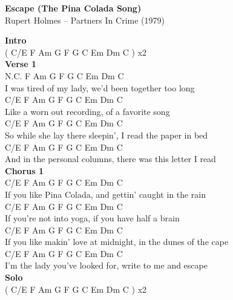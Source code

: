 \documentclass[a4paper]{article}
\begin{document}
    \begin{center}
        \textbf{Escape (The Pina Colada Song)}
        ~\\
        Rupert Holmes -- Partners In Crime (1979)
    \end{center}
    {
        \scriptsize
        \textbf{Intro}
        ~\\
        {
            \cutive
            \obeyspaces
( C/E  F Am G F  G  C Em Dm C ) x2
\\

        }
        \textbf{Verse 1}
        ~\\
        {
            \cutive
            \obeyspaces
N.C.                  F Am G F              G          C Em Dm C
\\
I was tired of my lady,      we'd been together too long
\\
       C/E         F     Am G F      G        C Em Dm C
\\
Like a worn out recording,     of a favorite song
\\
             C/E         F    Am G F            G        C Em Dm C
\\
So while she lay there sleepin',    I read the paper in bed
\\
           C/E       F    Am G F                 G         C Em Dm C
\\
And in the personal columns,     there was this letter I read
\\

        }
        \textbf{Chorus 1}
        ~\\
        {
            \cutive
            \obeyspaces
             C/E    F  Am G F              G             C Em Dm C
\\
If you like Pina Colada,      and gettin' caught in the rain
\\
          C/E       F  Am G F        G            C Em Dm C
\\
If you're not into yoga,     if you have half a brain
\\
            C/E             F     Am G F        G            C Em Dm C
\\
If you like makin' love at midnight,    in the dunes of the cape
\\
        C/E          F       Am G F          G         C Em Dm C
\\
I'm the lady you've looked for,     write to me and escape
\\

        }
        \textbf{Solo}
        ~\\
        {
            \cutive
            \obeyspaces
( C/E  F Am G F  G  C Em Dm C ) x2
\\

}}
\end{document}

